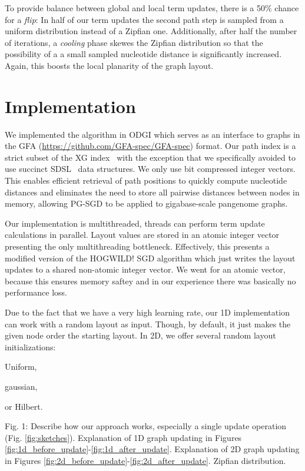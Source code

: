 \documentclass{bioinfo}
\theoremstyle{definition}
\begin{document}
	To provide balance between global and local term updates, there is a 50\% chance for a \textit{flip}: In half of our term updates the second path step is sampled from a uniform distribution instead of a Zipfian one. Additionally, after half the number of iterations, a \textit{cooling} phase skewes the Zipfian distribution so that the possibility of a a small sampled nucleotide distance is significantly increased. Again, this boosts the local planarity of the graph layout.
	
	\section{Implementation}
	
	We implemented the algorithm in ODGI which serves as an interface to graphs in the GFA (\url{https://github.com/GFA-spec/GFA-spec}) format. 
	Our path index is a strict subset of the XG index~\citep{Garrison:2018} with the exception that
	we specifically avoided to use succinct SDSL~\citep{Gog2014} data structures. We only use bit compressed integer vectors. 
	This enables efficient retrieval of path positions to quickly compute nucleotide distances and eliminates the need to store all pairwise distances between nodes in memory, allowing PG-SGD to be applied to gigabase-scale pangenome graphs.

	Our implementation is multithreaded, threads can perform term update calculations in parallel. Layout values are stored in an atomic integer vector presenting the only multithreading bottleneck. Effectively, this presents a modified version of the HOGWILD! SGD algorithm which just writes the layout updates to a shared non-atomic integer vector. We went for an atomic vector, because this ensures memory saftey and in our experience there was basically no performance loss.
	
	Due to the fact that we have a very high learning rate, our 1D implementation can work with a random layout as input. Though, by default, it just makes the given node order the starting layout. In 2D, we offer several random layout initializations: 
		\begin{enumerate*}[label=(\roman*)]
		\item Uniform,
		\item gaussian,
		\item or Hilbert.
	\end{enumerate*}

    \iffalse
    Fig. 1: Describe how our approach works, especially a single update operation (Fig. \ref{fig:sketches}). Explanation of 1D graph updating in Figures \ref{fig:1d_before_update}-\ref{fig:1d_after_update}. Explanation of 2D graph updating in Figures \ref{fig:2d_before_update}-\ref{fig:2d_after_update}. Zipfian distribution.
\end{document}
